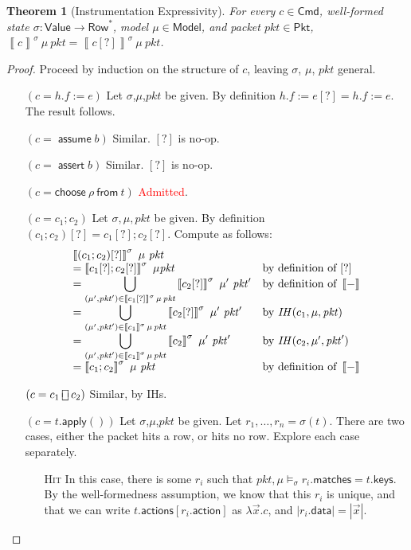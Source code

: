 \documentclass{article}
\newcommand{\pkt}{\mathit{pkt}}
\newcommand{\denote}[1]{\left\llbracket#1\right\rrbracket}
\newcommand{\Value}{\mathsf{Value}}
\newcommand{\Cmd}{\mathsf{Cmd}}
\newcommand{\Pkt}{\mathsf{Pkt}}
\newcommand{\Model}{\mathsf{Model}}
\newcommand{\Row}{\mathsf{Row}}
\newcommand{\matches}{\mathsf{matches}}
\newcommand{\action}{\mathsf{action}}
\newcommand{\actions}{\mathsf{actions}}
\newcommand{\keys}{\mathsf{keys}}
\newcommand{\data}{\mathsf{data}}
\newcommand{\assert}{\mathop{\mathsf{assert}}}
\newcommand{\assume}{\mathop{\mathsf{assume}}}
\newcommand{\apply}{\mathsf{apply}}
\newcommand{\choiceop}{\rotatebox[origin=c]{90}{$\sqsubset\!\!\!\sqsupset$}}
\newcommand{\choice}{\mathbin{\choiceop}}
\renewcommand{\choose}[2]{\mathsf{choose}~#1~\mathsf{from}~#2}
\newtheorem{theorem}{Theorem}
\begin{document}
\begin{theorem}[Instrumentation Expressivity]
  For every $c \in \Cmd$, well-formed state $\sigma : \Value \to \Row^*$, model
  $\mu \in \Model$, and packet $\pkt \in \Pkt$, $\denote{c}^\sigma~\mu~\pkt =
  \denote{c[?]}^\sigma~\mu~\pkt$.
\end{theorem}

\begin{proof}
  Proceed by induction on the structure of $c$, leaving $\sigma$, $\mu$, $\pkt$ general.
  \begin{enumerate}[align=left]
  \item[$(c = h.f := e)$]
    Let $\sigma$,$\mu$,$\pkt$ be given.
    By definition $h.f:=e[?] = h.f:=e$. The result follows.
  \item[$(c = \assume b)$] Similar. $[?]$ is no-op.
  \item[$(c = \assert b)$] Similar. $[?]$ is no-op.
  \item[$(c = \choose \rho t)$] \textcolor{red}{Admitted}.
  \item[$(c = c_1;c_2)$]
    Let $\sigma,\mu,\pkt$ be given.
    By definition $(c_1;c_2)[?] = c_1[?]; c_2[?]$.
    Compute as follows:
    \[\begin{array}{>{\displaystyle}ll}
    \denote{(c_1;c_2)[?]}^\sigma~\mu~\pkt \\
    = \denote{c_1[?];c_2[?]}^\sigma~\mu\pkt
    & \text{by definition of } [?]  \\
    = \bigcup_{(\mu',\pkt') \in \denote{c_1[?]}^\sigma\,\mu\,\pkt}\denote{c_2[?]}^\sigma~\mu'~\pkt'
    & \text{by definition of }\denote{-} \\
    = \bigcup_{(\mu',\pkt') \in \denote{c_1}^\sigma\,\mu\,\pkt}\denote{c_2[?]}^\sigma~\mu'~\pkt'
    & \text{by } \mathit{IH}(c_1, \mu, \pkt) \\
    = \bigcup_{(\mu',\pkt') \in \denote{c_1}^\sigma\,\mu\,\pkt}\denote{c_2}^\sigma~\mu'~\pkt'
    & \text{by } \mathit{IH}(c_2, \mu', \pkt') \\
    = \denote{c_1;c_2}^\sigma~\mu~\pkt
    & \text{by definition of } \denote{-}
    \end{array}
    \]
  \item[$(c = c_1 \choice c_2)$] Similar, by IHs.

  \item[$(c = t.\apply())$]
    Let $\sigma$,$\mu$,$\pkt$ be given.
    Let $r_1,\ldots,r_n = \sigma(t)$.
    There are two cases, either the packet hits a row, or hits no row. Explore each case separately.
    \begin{enumerate}
    \item[\textsc{Hit}] In this case, there is some $r_i$ such that $\pkt,\mu
      \models_\sigma r_i.\matches = t.\keys$. By the well-formedness assumption,
      we know that this $r_i$ is unique, and that we can write
      $t.\actions[r_i.\action]$ as $\lambda \vec x. c$, and $|r_i.\data| = |\vec x|$.


\end{enumerate}
\end{enumerate}
\end{proof}
\end{document}
